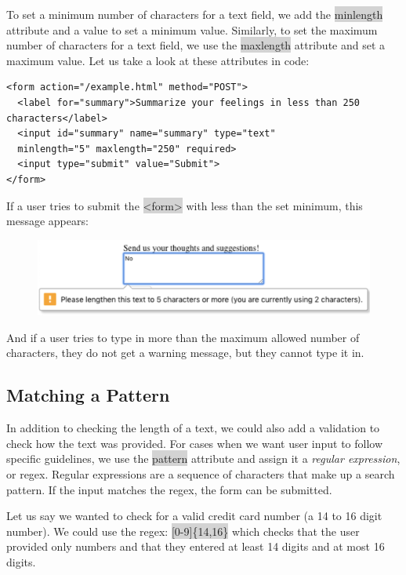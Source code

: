 \documentclass[11pt]{article}
\begin{document}
To set a minimum number of characters for a text field, we add the \colorbox{lightgray}{minlength} attribute and a value to set a minimum value. Similarly, to set the maximum number of characters for a text field, we use the \colorbox{lightgray}{maxlength} attribute and set a maximum value. Let us take a look at these attributes in code:
\begin{lstlisting}
<form action="/example.html" method="POST">
  <label for="summary">Summarize your feelings in less than 250 characters</label>
  <input id="summary" name="summary" type="text" 
  minlength="5" maxlength="250" required>
  <input type="submit" value="Submit">
</form>
\end{lstlisting}
If a user tries to submit the \colorbox{lightgray}{<form>} with less than the set minimum, this message appears:
\begin{figure}[H]
\includegraphics[scale = 0.75]{5_3}
\centering
\end{figure}
\vspace{-4mm}

And if a user tries to type in more than the maximum allowed number of characters, they do not get a warning message, but they cannot type it in. 

\subsection{Matching a Pattern}
In addition to checking the length of a text, we could also add a validation to check how the text was provided. For cases when we want user input to follow specific guidelines, we use the \colorbox{lightgray}{pattern} attribute and assign it a \textit{regular expression}, or regex. Regular expressions are a sequence of characters that make up a search pattern. If the input matches the regex, the form can be submitted.

Let us say we wanted to check for a valid credit card number (a 14 to 16 digit number). We could use the regex: \colorbox{lightgray}{[0-9]\{14,16\}} which checks that the user provided only numbers and that they entered at least 14 digits and at most 16 digits.
\end{document}
